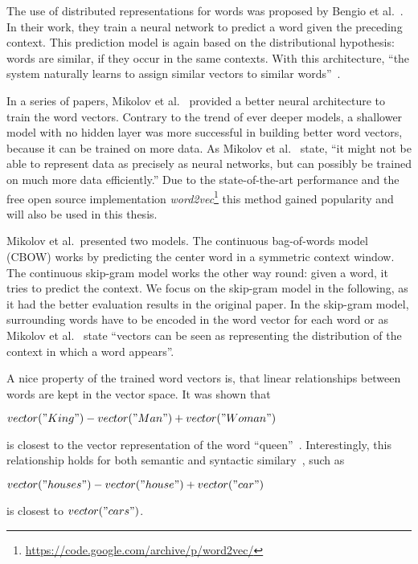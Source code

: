 \documentclass{sig-alternate-05-2015}
\begin{document}
The use of distributed representations for words was proposed by Bengio et al.~\cite{Bengio2003}.
In their work, they train a neural network to predict a word given the preceding context.
This prediction model is again based on the distributional hypothesis: words are similar, if they occur in the same contexts.
With this architecture, ``the system naturally learns to assign similar vectors to similar words''~\cite{Baroni2014}.

In a series of papers, Mikolov et al.~\cite{Mikolov2013,Mikolov2013a,Mikolov2013b} provided a better neural architecture to train the word vectors.
Contrary to the trend of ever deeper models, a shallower model with no hidden layer was more successful in building better word vectors, because it can be trained on more data.
As Mikolov et al.~\cite{Mikolov2013a} state, ``it might not be able to represent data as precisely as neural networks, but can possibly be trained on much more data efficiently.''
Due to the state-of-the-art performance and the free open source implementation \emph{word2vec}\footnote{\url{https://code.google.com/archive/p/word2vec/}} this method gained popularity and will also be used in this thesis.

Mikolov et al.\ presented two models.
The continuous bag-of-words model (CBOW) works by predicting the center word in a symmetric context window.
The continuous skip-gram model works the other way round: given a word, it tries to predict the context.
We focus on the skip-gram model in the following, as it had the better evaluation results in the original paper.
In the skip-gram model, surrounding words have to be encoded in the word vector for each word or as Mikolov et al.~\cite{Mikolov2013} state ``vectors can be seen as representing the distribution of the context in which a word appears''.


A nice property of the trained word vectors is, that linear relationships between words are kept in the vector space.
It was shown that
\begin{center}
       $vector("King") - vector("Man") + vector("Woman")$
\end{center}
is closest to the vector representation of the word ``queen''~\cite{Mikolov2013b}.
Interestingly, this relationship holds for both semantic and syntactic similary~\cite{Mikolov2013a}, such as
\begin{center}
       $vector("houses") - vector("house") + vector("car")$
\end{center}
is closest to $vector("cars")$.
\end{document}
